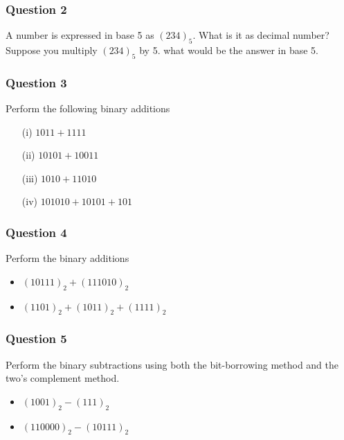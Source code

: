 \documentclass[]{report}
\begin{document}
\subsubsection*{Question 2}
A number is expressed in base 5 as $(234)_5$. What is it as decimal number?
Suppose you multiply $(234)_5$ by 5. what would be the answer in base 5.

\subsubsection*{Question 3}

Perform the following binary additions
\begin{multicols}{2}
\begin{itemize}
\item[(i)] $1011+ 1111$
\item[(ii)] $10101  + 10011$
\item[(iii)] $1010 + 11010$
\item[(iv)] $101010 + 10101 + 101$
\end{itemize}
\end{multicols}


\subsubsection*{Question 4}
Perform the binary additions

\begin{itemize}
\item $(10111)_2 +(111010)_2$

\item $(1101)_2 + (1011)_2 + (1111)_2$
\end{itemize}

\subsubsection*{Question 5}

Perform the binary subtractions using both the bit-borrowing method and the two's complement method.
\begin{itemize}
\item $(1001)_2 -(111)_2$
\item $(110000)_2 -(10111)_2$
\end{itemize}


\end{document}
